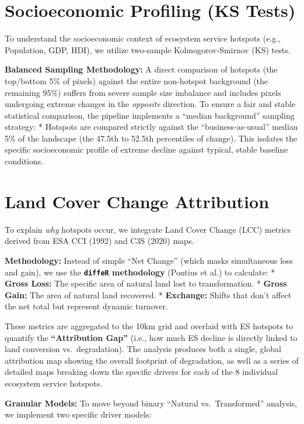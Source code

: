 \documentclass[
  letterpaper,
  DIV=11,
  numbers=noendperiod]{scrreprt}
\begin{document}
\section{Socioeconomic Profiling (KS
Tests)}\label{socioeconomic-profiling-ks-tests}

To understand the socioeconomic context of ecosystem service hotspots
(e.g., Population, GDP, HDI), we utilize two-sample Kolmogorov-Smirnov
(KS) tests.

\textbf{Balanced Sampling Methodology:} A direct comparison of hotspots
(the top/bottom 5\% of pixels) against the entire non-hotspot background
(the remaining 95\%) suffers from severe sample size imbalance and
includes pixels undergoing extreme changes in the \emph{opposite}
direction. To ensure a fair and stable statistical comparison, the
pipeline implements a ``median background'' sampling strategy: *
Hotspots are compared strictly against the ``business-as-usual'' median
5\% of the landscape (the 47.5th to 52.5th percentiles of change). This
isolates the specific socioeconomic profile of extreme decline against
typical, stable baseline conditions.

\section{Land Cover Change
Attribution}\label{land-cover-change-attribution}

To explain \emph{why} hotspots occur, we integrate Land Cover Change
(LCC) metrics derived from ESA CCI (1992) and C3S (2020) maps.

\textbf{Methodology:} Instead of simple ``Net Change'' (which masks
simultaneous loss and gain), we use the \textbf{\texttt{diffeR}
methodology} (Pontius et al.) to calculate: * \textbf{Gross Loss:} The
specific area of natural land lost to transformation. * \textbf{Gross
Gain:} The area of natural land recovered. * \textbf{Exchange:} Shifts
that don't affect the net total but represent dynamic turnover.

These metrics are aggregated to the 10km grid and overlaid with ES
hotspots to quantify the \textbf{``Attribution Gap''} (i.e., how much ES
decline is directly linked to land conversion vs.~degradation). The
analysis produces both a single, global attribution map showing the
overall footprint of degradation, as well as a series of detailed maps
breaking down the specific drivers for each of the 8 individual
ecosystem service hotspots.

\textbf{Granular Models:} To move beyond binary ``Natural
vs.~Transformed'' analysis, we implement two specific driver models:
\end{document}
